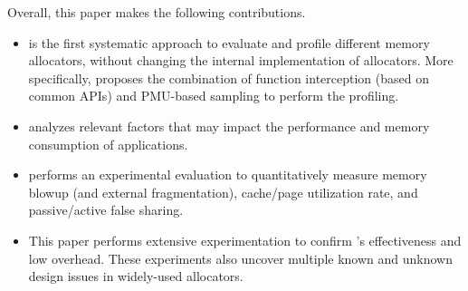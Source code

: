 Overall, this paper makes the following contributions. 

\begin{itemize}
\item \MP{} is the first systematic approach to evaluate and profile different memory allocators, without changing the internal implementation of allocators. More specifically, \MP{} proposes the combination of function interception (based on common APIs) and PMU-based sampling to perform the profiling.


\item \MP{} analyzes relevant factors that may impact the performance and memory consumption of applications.

\item \MP{} performs an experimental evaluation to quantitatively measure memory blowup (and external fragmentation), cache/page utilization rate, and passive/active false sharing. 
\item This paper performs extensive experimentation to confirm \MP{}'s effectiveness and low overhead. These experiments also uncover multiple known and unknown design issues in widely-used allocators.  

\end{itemize} 


